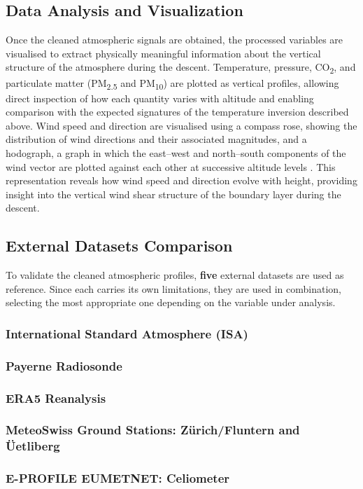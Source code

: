 \subsection{Data Analysis and Visualization}
\noindent Once the cleaned atmospheric signals are obtained, the processed variables are visualised to extract physically meaningful information about the vertical structure of the atmosphere during the descent. Temperature, pressure, CO\textsubscript{2}, and particulate matter (PM\textsubscript{2.5} and PM\textsubscript{10}) are plotted as vertical profiles, allowing direct inspection of how each quantity varies with altitude and enabling comparison with the expected signatures of the temperature inversion described above. Wind speed and direction are visualised using a compass rose, showing the distribution of wind directions and their associated magnitudes, and a hodograph, a graph in which the east--west and north--south components of the wind vector are plotted against each other at successive altitude levels \citep{lohmann2024}. This representation reveals how wind speed and direction evolve with height, providing insight into the vertical wind shear structure of the boundary layer during the descent. 


\subsection{External Datasets Comparison}
To validate the cleaned atmospheric profiles, \textbf{five} external datasets are used as reference. Since each carries its own limitations, they are used in combination, selecting the most appropriate one depending on the variable under analysis.

\subsubsection{International Standard Atmosphere (ISA)}
\subsubsection{Payerne Radiosonde}
\subsubsection{ERA5 Reanalysis}
\subsubsection{MeteoSwiss Ground Stations: Zürich/Fluntern and Üetliberg}
\subsubsection{E-PROFILE EUMETNET: Celiometer}
